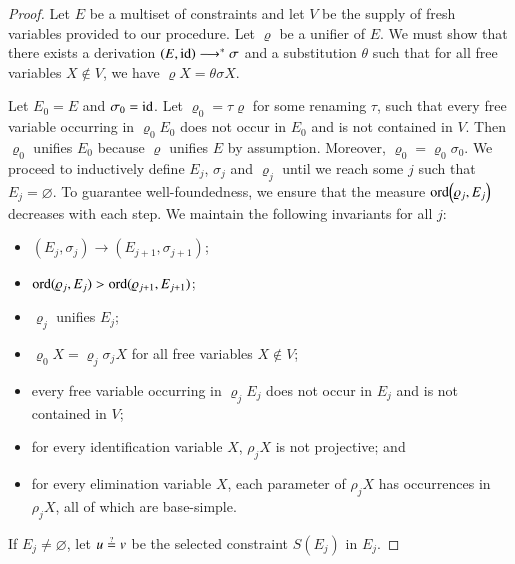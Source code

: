     \begin{proof}
    Let $E$ be a multiset of constraints
    and let $V$ be the supply of fresh variables provided to our procedure. 
    Let $\varrho$ be a unifier of $E$.
    We must show that there exists
    a derivation $\left(E,\makeop{id}\right)\longrightarrow^{*}\sigma$ and a
    substitution $\theta$ such that for all free variables $X\not\in V$, we have $\varrho X = \theta\sigma X$.
     

    Let $E_{0}=E$ and $\sigma_{0}=\operatorname{id}$. 
    Let $\varrho_{0}=\tau\varrho$ for some renaming $\tau$, such that 
    every free variable occurring in $\varrho_{0}E_{0}$ does not occur in $E_{0}$ and is not contained in $V$.
    Then $\varrho_{0}$
    unifies $E_{0}$ because $\varrho$ unifies $E$ by assumption.
    Moreover, $\varrho_{0}=\varrho_{0}\sigma_{0}$. We proceed
    to inductively define $E_{j}$, $\sigma_{j}$ and $\varrho_{j}$
    until we reach some $j$ such that $E_j = \varnothing$.
    To guarantee well-foundedness, we ensure that the measure 
    $\ord\left(\varrho_{j},E_{j}\right)$ decreases with each step.
    We maintain the following invariants for all $j$:
    \begin{itemize}
    \item $(E_{j},\sigma_{j})\longrightarrow(E_{j+1},\sigma_{j+1})$;
    \item $\operatorname{ord}(\varrho_{j},E_{j}) > \operatorname{ord}(\varrho_{j+1},E_{j+1})$;
    \item $\varrho_{j}$ unifies $E_{j}$;
    \item $\varrho_{0} X = \varrho_{j}\sigma_{j} X$ for all free variables $X\not\in V$;
    \item every free variable occurring in $\varrho_{j}E_{j}$ does not occur in $E_{j}$ and is not contained in $V$;
    \item for every identification variable $X$, $\rho_j X$ is not projective; and
    \item for every elimination variable $X$, each parameter of $\rho_j X$ 
          has occurrences in $\rho_j X$,
          all of which are base-simple.
    \end{itemize}
    If $E_j \not= \varnothing$, let $u\unif v$ be the selected constraint $S(E_{j})$ in $E_{j}$.
    

\end{proof}

